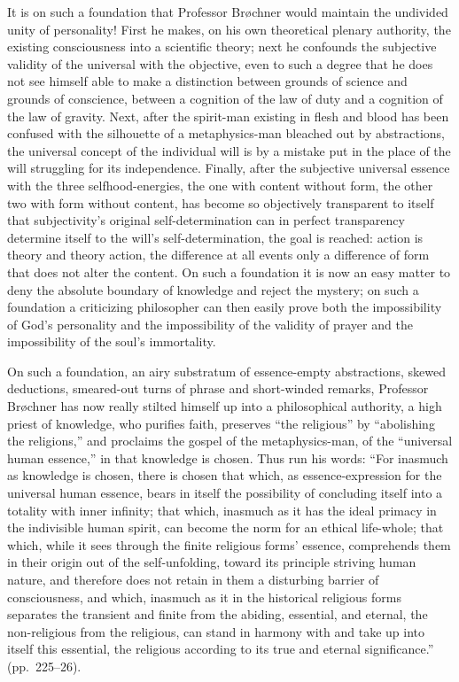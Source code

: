 \documentclass[12pt]{book}
\newcommand{\opage}[1]{\marginnote{\footnotesize\textit{[#1]}}}
\begin{document}
It is on such a foundation that Professor Brøchner would maintain the
undivided unity of personality! First he makes, on his own theoretical
plenary authority, the existing consciousness into a scientific theory; next
he confounds the subjective validity of the universal with the objective,
even to such a degree that he does not see himself able to make a
distinction between grounds of science and grounds of conscience, between a
cognition of the law of duty and a cognition of the law of gravity.
Next, after the spirit-man existing in flesh and blood has been confused
with the silhouette of a metaphysics-man bleached out by abstractions, the
universal concept of the individual will is by a mistake put in the place of
the will struggling for its independence. Finally, after the subjective
universal essence with the three selfhood-energies, the one with content
without form, the other two
\opage{44}\setcounter{footnote}{0}%
with form without content, has become so objectively transparent to itself
that subjectivity's original self-determination can in perfect transparency
determine itself to the will's self-determination, the goal is reached:
action is theory and theory action, the difference at all events only a
difference of form that does not alter the content. On such a foundation it
is now an easy matter to deny the absolute boundary of knowledge and reject
the mystery; on such a foundation a criticizing philosopher can then easily
prove both the impossibility of God's personality and the impossibility of
the validity of prayer and the impossibility of the soul's immortality.

On such a foundation, an airy substratum of essence-empty abstractions,
skewed deductions, smeared-out turns of phrase and short-winded remarks,
Professor Brøchner has now really stilted himself up into a philosophical
authority, a high priest of knowledge, who purifies faith, preserves ``the
religious'' by ``abolishing the religions,'' and proclaims the gospel of the
metaphysics-man, of the ``universal human essence,'' in that knowledge is
chosen. Thus run his words: ``For inasmuch as knowledge is chosen, there is
chosen that which, as essence-expression for the universal human essence,
bears in itself the possibility of concluding itself into a totality with
inner infinity; that which, inasmuch as it has the ideal primacy in the
indivisible human spirit, can become the norm for an ethical life-whole;
that which, while it sees through the finite religious forms' essence,
comprehends them in their origin out of the self-unfolding, toward its
principle striving human nature, and therefore does not retain in them a
disturbing barrier of consciousness, and which, inasmuch as it in the
historical religious forms separates the transient and finite from the
abiding, essential, and eternal, the non-religious from the religious, can
stand in harmony with and take up into itself
\opage{45}\setcounter{footnote}{0}%
this essential, the religious according to its true and eternal
significance.'' (pp.\ 225--26).
\end{document}
